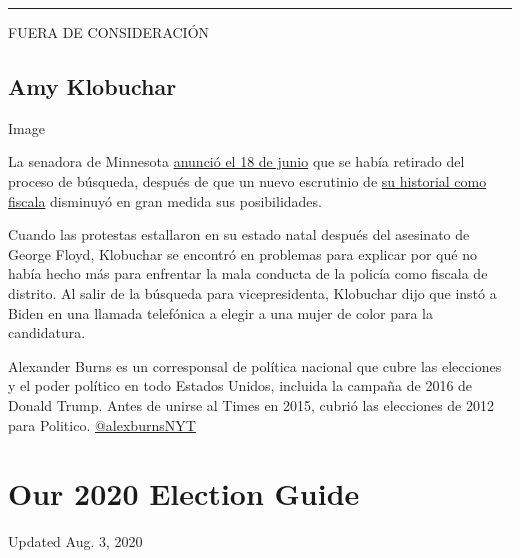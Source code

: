\begin{center}\rule{0.5\linewidth}{\linethickness}\end{center}

FUERA DE CONSIDERACIÓN

\hypertarget{amy-klobuchar}{%
\subsection{Amy Klobuchar}\label{amy-klobuchar}}

Image

La senadora de Minnesota
\href{https://www.nytimes.com/2020/06/18/us/politics/amy-klobuchar-biden-vice-president.html}{anunció
el 18 de junio} que se había retirado del proceso de búsqueda, después
de que un nuevo escrutinio de
\href{https://www.nytimes.com/2020/05/29/us/politics/klobuchar-minneapolis-george-floyd.html}{su
historial como fiscala} disminuyó en gran medida sus posibilidades.

Cuando las protestas estallaron en su estado natal después del asesinato
de George Floyd, Klobuchar se encontró en problemas para explicar por
qué no había hecho más para enfrentar la mala conducta de la policía
como fiscala de distrito. Al salir de la búsqueda para vicepresidenta,
Klobuchar dijo que instó a Biden en una llamada telefónica a elegir a
una mujer de color para la candidatura.

Alexander Burns es un corresponsal de política nacional que cubre las
elecciones y el poder político en todo Estados Unidos, incluida la
campaña de 2016 de Donald Trump. Antes de unirse al Times en 2015,
cubrió las elecciones de 2012 para Politico.
\href{https://twitter.com/alexburnsNYT}{@alexburnsNYT}

\hypertarget{our-2020-election-guide}{%
\section{Our 2020 Election Guide}\label{our-2020-election-guide}}

Updated Aug. 3, 2020

